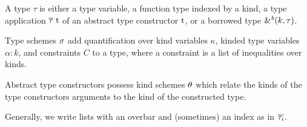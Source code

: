 A type $\tau$ is either a type variable, a function type indexed by a
kind, 
a type application $\tapp{t}{\Multi{\tau}}$ of an abstract type constructor
$\T t$, or a borrowed type  $\borrowty{k}{\tau}$.

Type schemes $\schm$ add quantification over kind
variables $\kappa$, kinded type variables $\alpha:k$, and constraints
$C$ to a type, where a constraint is a list of inequalities over
kinds.

Abstract type constructors possess kind schemes $\kschm$ which relate
the kinds of the type constructors arguments to the kind of the
constructed type.

Generally, we write lists with an overbar and (sometimes) an index as
in $\Multi[i]\tau$.





